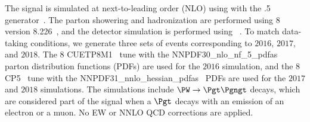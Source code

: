 The signal is simulated at next-to-leading order (NLO) using with the .5 generator~\cite{MGatNLO}. The parton showering and hadronization are performed using {\PYTHIA}8 version 8.226~\cite{Sjostrand:2014zea}, and the detector simulation is performed using \GEANTfour~\cite{AGOSTINELLI2003250}. To match data-taking conditions, we generate three sets of events corresponding to $2016$, $2017$, and $2018$. The {\PYTHIA}8 CUETP8M1~\cite{Khachatryan:2015pea} tune with the NNPDF30\_nlo\_nf\_5\_pdfas~\cite{Ball_2015} parton distribution functions (PDFs) are used for the $2016$ simulation, and the {\PYTHIA}8 CP5~\cite{Sirunyan:2019dfx} tune with the NNPDF31\_nnlo\_hessian\_pdfas~\cite{collaboration2017parton} PDFs are used for the $2017$ and $2018$ simulations. The simulations include $\PW \to \Pgt \Pgngt$ decays, which are considered part of the signal when a $\Pgt$ decays with an emission of an electron or a muon. No EW or NNLO QCD corrections are applied.

